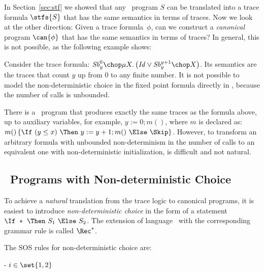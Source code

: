\documentclass[a4paper,numberwithinsect]{lipics-v2021}
\begin{document}
In Section~\ref{sec:stf} we showed that any \Rec\ program $S$ can be
translated into a trace formula $\stfs{S}$ that has the same semantics
in terms of traces. Now we look at the other direction: Given a trace
formula~$\phi$, can we construct a \emph{canonical} program
$\can{\phi}$ that has the same semantics in terms of traces?
%
In general, this is not possible, as the following example shows:

\begin{example}\label{ex:nondet}
  Consider the trace formula:
  $
    \mathit{Sb}_y^0\chop\mu X.\left(\mathit{Id}\lor\mathit{Sb}_y^{y+1}\chop X\right)
  $.
  Its semantics are the traces that count $y$ up from $0$ to any
  finite number. It is not possible to model the non-deterministic
  choice in the fixed point formula directly in \Rec, because the
  number of calls is unbounded.

  There is a \Rec\ program that produces exactly the same traces as
  the formula above, up to auxiliary variables, for example,
  $y:=0;m()$, where $m$ is declared as:
  $m()\,\{\If\ (y\leq x)\ \Then\ y:=y+1;m()\ \Else\ \Skip
  \}$. However, to transform an arbitrary formula with unbounded
  non-determinism in the number of calls to an equivalent one with
  non-deterministic initialization, is difficult and not natural.
\end{example}


\subsection{\Rec\ Programs with Non-deterministic Choice}
\label{sec:recast-programs}

To achieve a \emph{natural} translation from the trace logic to
canonical programs, it is easiest to introduce \emph{non-deterministic
  choice} in the form of a statement
$\If\ \ast\ \Then\ S_1\ \Else\ S_2$. The extension of language \Rec\
with the corresponding grammar rule is called $\Rec^\ast$.

The SOS rules for non-deterministic choice are:
%
\begin{center}
  {-}
  {} \quad $i \in \set{1, 2}$ %
\end{center}
\end{document}
